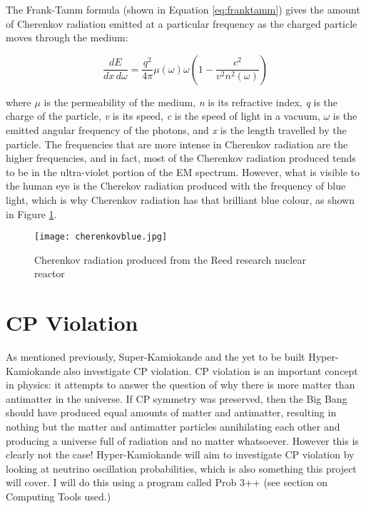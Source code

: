 \documentclass[11pt,oneside,a4paper]{article}
\begin{document}
The Frank-Tamm formula (shown in Equation \ref{eq:franktamm}) gives the amount of Cherenkov radiation emitted at a particular frequency as the charged particle moves through the medium:

\begin{equation}
\label{eq:franktamm}
{\frac  {dE}{dx\,d\omega }}={\frac  {q^{2}}{4\pi }}\mu (\omega )\omega {\left(1-{\frac  {c^{2}}{v^{2}n^{2}(\omega )}}\right)}
\end{equation}

where \textit{$\mu$} is the permeability of the medium, \textit{n} is its refractive index, \textit{q} is the charge of the particle, \textit{v} is its speed, \textit{c} is the speed of light in a vacuum, \textit{$\omega$} is the emitted angular frequency of the photons, and \textit{x} is the length travelled by the particle. The frequencies that are more intense in Cherenkov radiation are the higher frequencies, and in fact, most of the Cherenkov radiation produced tends to be in the ultra-violet portion of the EM spectrum. However, what is visible to the human eye is the Cherekov radiation produced with the frequency of blue light, which is why Cherenkov radiation has that brilliant blue colour, as shown in Figure \ref{fig:bluecherenkov}.

\begin{figure}[htbp]
	\centering
	\texttt{[image: cherenkovblue.jpg]}
	\captionsetup{justification=centering}
	\caption{Cherenkov radiation produced from the Reed research nuclear reactor}
	\label{fig:bluecherenkov}
\end{figure}

\section{CP Violation}
As mentioned previously, Super-Kamiokande and the yet to be built Hyper-Kamiokande also investigate CP violation. CP violation is an important concept in physics: it attempts to answer the question of why there is more matter than antimatter in the universe. If CP symmetry was preserved, then the Big Bang should have produced equal amounts of matter and antimatter, resulting in nothing but the matter and antimatter particles annihilating each other and producing a universe full of radiation and no matter whatsoever. However this is clearly not the case! Hyper-Kamiokande will aim to investigate CP violation by looking at neutrino oscillation probabilities, which is also something this project will cover. I will do this using a program called Prob 3++ (see section on Computing Tools used.)
\end{document}
